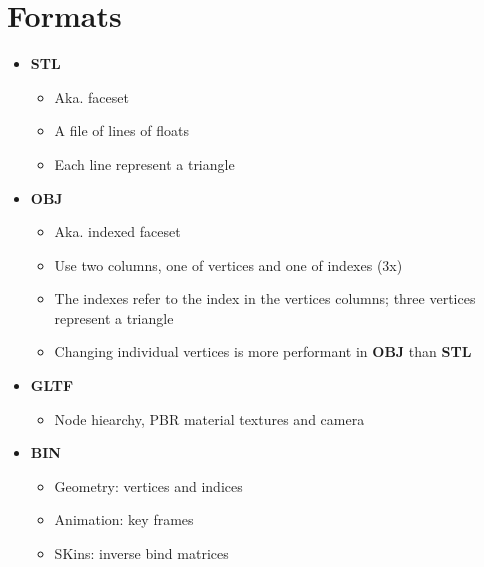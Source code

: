 \section{Formats}

\begin{itemize}
  \item \textbf{STL}
  \begin{itemize}
    \item Aka. faceset
    \item A file of lines of floats
    \item Each line represent a triangle
  \end{itemize}

  \item \textbf{OBJ}
  \begin{itemize}
    \item Aka. indexed faceset
    \item Use two columns, one of vertices and one of indexes (3x)
    \item The indexes refer to the index in the vertices columns;
    three vertices represent a triangle
    \item Changing individual vertices is more performant in \textbf{OBJ}
    than \textbf{STL}
  \end{itemize}

  \item \textbf{GLTF}
  \begin{itemize}
    \item Node hiearchy, PBR material textures and camera
  \end{itemize}

  \item \textbf{BIN}
  \begin{itemize}
    \item Geometry: vertices and indices
    \item Animation:  key frames
    \item SKins: inverse bind matrices
  \end{itemize}
\end{itemize}
